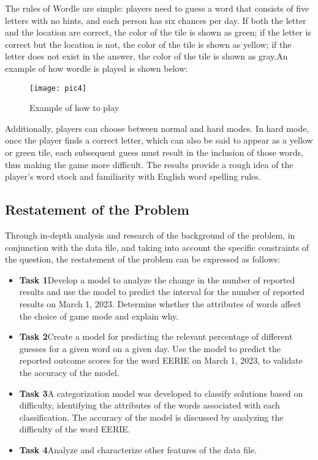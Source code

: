 \documentclass[12pt]{article}  %
\begin{document}
The rules of Wordle are simple: players need to guess a word that consists of five letters with no hints, and each person has six chances per day. If both the letter and the location are correct, the color of the tile is shown as green; if the letter is correct but the location is not, the color of the tile is shown as yellow; if the letter does not exist in the answer, the color of the tile is shown as gray.An example of how wordle is played is shown below:

\begin{figure}[htbp]  %
\centering  %
\texttt{[image: pic4]} %
\caption{Example of how to play\cite{1}} %
\end{figure}
\vspace{-0.5cm}

Additionally, players can choose between normal and hard modes. In hard mode, once the player finds a correct letter, which can also be said to appear as a yellow or green tile, each subsequent guess must result in the inclusion of those words, thus making the game more difficult.
The results provide a rough idea of the player's word stock and familiarity with English word spelling rules.

\subsection{Restatement of the Problem}
Through in-depth analysis and research of the background of the problem, in conjunction with the data file, and taking into account the specific constraints of the question, the restatement of the problem can be expressed as follows: 

\begin{itemize}
\setlength{\parsep}{0ex} %
\setlength{\topsep}{2ex} %
\setlength{\itemsep}{1ex} %
\item \textbf{Task 1}\quad Develop a model to analyze the change in the number of reported results and use the model to predict the interval for the number of reported results on March 1, 2023. Determine whether the attributes of words affect the choice of game mode and explain why.

\item \textbf{Task 2}\quad Create a model for predicting the relevant percentage of different guesses for a given word on a given day. Use the model to predict the reported outcome scores for the word EERIE on March 1, 2023, to validate the accuracy of the model.

\item \textbf{Task 3}\quad A categorization model was developed to classify solutions based on difficulty, identifying the attributes of the words associated with each classification. The accuracy of the model is discussed by analyzing the difficulty of the word EERIE.

\item \textbf{Task 4}\quad Analyze and characterize other features of the data file.
\end{itemize}
\end{document}
